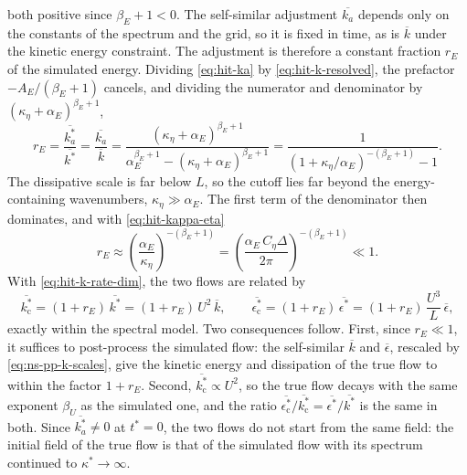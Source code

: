 \documentclass{article}
\begin{document}
both positive since $\beta_E + 1 < 0$. The self-similar adjustment
$\overline{k_a}$ depends only on the constants of the spectrum and the grid, so
it is fixed in time, as is $\overline{k}$ under the kinetic energy constraint.
The adjustment is therefore a constant fraction $r_E$ of the simulated energy.
Dividing \eqref{eq:hit-ka} by \eqref{eq:hit-k-resolved}, the prefactor
$-A_E/(\beta_E + 1)$ cancels, and dividing the numerator and denominator by
$(\kappa_\eta + \alpha_E)^{\beta_E + 1}$,
\begin{equation}\label{eq:hit-r-exact}
  r_E = \frac{\overline{k_a^*}}{\overline{k^*}} = \frac{\overline{k_a}}{\overline{k}}
  = \frac{(\kappa_\eta + \alpha_E)^{\beta_E + 1}}
         {\alpha_E^{\beta_E + 1} - (\kappa_\eta + \alpha_E)^{\beta_E + 1}}
  = \frac{1}{\left(1 + \kappa_\eta / \alpha_E\right)^{-(\beta_E + 1)} - 1} .
\end{equation}
The dissipative scale is far below $L$, so the cutoff lies far beyond the
energy-containing wavenumbers, $\kappa_\eta \gg \alpha_E$. The first term of
the denominator then dominates, and with \eqref{eq:hit-kappa-eta}
\begin{equation}\label{eq:hit-r}
  r_E \approx \left( \frac{\alpha_E}{\kappa_\eta} \right)^{-(\beta_E + 1)}
  = \left( \frac{\alpha_E\, C_\eta \Delta}{2\pi} \right)^{-(\beta_E + 1)} \ll 1 .
\end{equation}
With
\eqref{eq:hit-k-rate-dim}, the two flows are related by
\begin{equation}\label{eq:hit-true-ratio}
  \overline{k_{\mathrm{c}}^*} = (1 + r_E)\, \overline{k^*} = (1 + r_E)\, U^2\, \overline{k},
  \qquad
  \overline{\epsilon_{\mathrm{c}}^*} = (1 + r_E)\, \overline{\epsilon^*} = (1 + r_E)\, \frac{U^3}{L}\, \overline{\epsilon},
\end{equation}
exactly within the spectral model. Two consequences follow. First, since
$r_E \ll 1$, it suffices to post-process the simulated flow: the self-similar
$\overline{k}$ and $\overline{\epsilon}$, rescaled by \eqref{eq:ns-pp-k-scales},
give the kinetic energy and dissipation of the true flow to within the factor
$1 + r_E$. Second, $\overline{k_{\mathrm{c}}^*} \propto U^2$, so the true flow
decays with the same exponent $\beta_U$ as the simulated one, and the ratio
$\overline{\epsilon_{\mathrm{c}}^*}/\overline{k_{\mathrm{c}}^*} = \overline{\epsilon^*}/\overline{k^*}$
is the same in both. Since $\overline{k_a^*} \neq 0$ at $t^* = 0$, the two flows do not
start from the same field: the initial field of the true flow is that of the
simulated flow with its spectrum continued to $\kappa^* \to \infty$.
\end{document}
